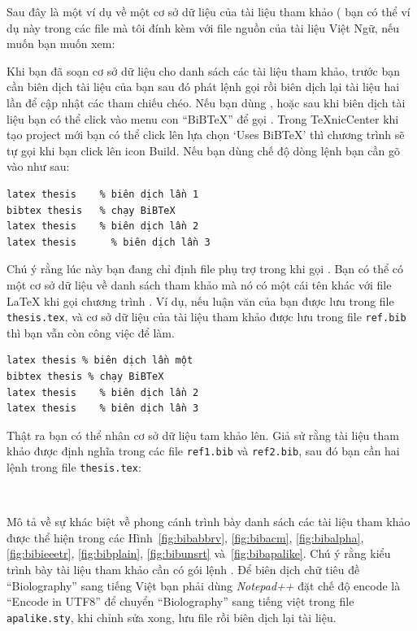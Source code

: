 \documentclass[a4paper]{report}
\begin{document}
Sau đây là một ví dụ về một cơ sở dữ liệu của tài liệu tham khảo ( bạn có thể  ví dụ này trong các file mà tôi đính kèm với file nguồn của tài liệu Việt Ngữ, nếu muốn bạn muốn xem:



Khi bạn đã soạn cơ sở dữ liệu cho danh sách các tài liệu tham khảo, trước bạn cần biên dịch tài liệu của bạn sau đó phát lệnh gọi \BiBTeX{}  rồi biên dịch lại tài liệu hai lần để cập nhật các tham chiếu chéo. Nếu bạn dùng , hoặc  sau khi biên dịch tài liệu bạn có thể click vào menu con ``BiBTeX'' để gọi \BiBTeX{}. Trong \TeX{}nicCenter khi tạo project mới bạn có thể click lên  lựa chọn `Uses BiBTeX' thì chương trình sẽ tự gọi \BiBTeX{} khi bạn click lên icon Build. Nếu bạn dùng chế độ dòng lệnh bạn cần gõ vào như sau:

\begin{verbatim}
latex thesis 	% biên dịch lần 1
bibtex thesis 	% chạy BiBTeX
latex thesis	% biên dịch lần 2
latex thesis      % biên dịch lần 3
\end{verbatim}
Chú ý rằng lúc này bạn đang chỉ định file phụ trợ trong khi gọi \BiBTeX. Bạn có thể có một cơ sở dữ liệu về danh sách tham khảo mà nó có một cái tên khác với file \LaTeX{} khi gọi chương trình \BiBTeX. 
Ví dụ, nếu luận văn của bạn được lưu trong file \texttt{thesis.tex}, và cơ sở dữ liệu của tài liệu tham khảo được lưu trong file \texttt{ref.bib} thì bạn vẫn còn công việc để làm.

\begin{verbatim}
latex thesis % biên dịch lần một
bibtex thesis % chạy BiBTeX
latex thesis	% biên dịch lần 2
latex thesis	% biên dịch lần 3
\end{verbatim}
Thật ra bạn có thể nhân cơ sở dữ liệu tam khảo lên. Giả sử rằng tài liệu tham khảo được định nghĩa trong các file \texttt{ref1.bib} và \texttt{ref2.bib}, sau đó bạn cần hai lệnh  trong file \texttt{thesis.tex}:

\begin{verbatim}


\end{verbatim}

Mô tả về sự khác biệt về phong cánh trình bày danh sách các tài liệu tham khảo được thể hiện trong các Hình~\ref{fig:bibabbrv}, \ref{fig:bibacm},
\ref{fig:bibalpha}, \ref{fig:bibieeetr}, \ref{fig:bibplain}, \ref{fig:bibunsrt} và~\ref{fig:bibapalike}.
Chú ý rằng kiểu trình bày tài liệu tham khảo  cần có gói lệnh . Để biên dịch chữ  tiêu đề ``Biolography'' sang tiếng Việt bạn phải dùng \emph{Notepad++}  đặt chế độ encode là ``Encode in UTF8'' để chuyển ``Biolography'' sang tiếng việt trong file \texttt{apalike.sty}, khi chỉnh sửa xong, lưu file rồi biên dịch lại tài liệu.
\end{document}
